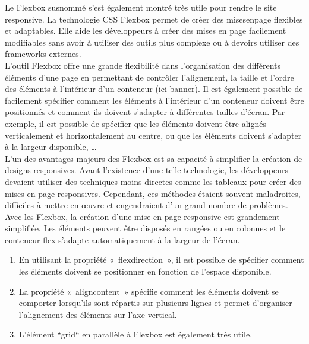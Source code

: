 \documentclass[a4,10pt,french]{sphinxmanual}
\begin{document}
\sphinxAtStartPar
Le Flex\sphinxhyphen{}box susnommé s’est également montré très utile pour rendre le site responsive. La technologie CSS Flex\sphinxhyphen{}box permet de créer des mises\sphinxhyphen{}en\sphinxhyphen{}page flexibles et adaptables. Elle aide les développeurs à créer des mises en page facilement modifiables sans avoir à utiliser des outils plus complexe ou à devoirs utiliser des frameworks externes.\\
L’outil Flex\sphinxhyphen{}box offre une grande flexibilité dans l’organisation des différents éléments d’une page en permettant de contrôler l’alignement, la taille et l’ordre des éléments à l’intérieur d’un conteneur (ici banner). Il est également possible de facilement spécifier comment les éléments à l’intérieur d’un conteneur doivent être positionnés et comment ils doivent s’adapter à différentes tailles d’écran. Par exemple, il est possible de spécifier que les éléments doivent être alignés verticalement et horizontalement au centre, ou que les éléments doivent s’adapter à la largeur disponible, …\\
L’un des avantages majeurs des Flex\sphinxhyphen{}box est sa capacité à simplifier la création de designs responsives. Avant l’existence d’une telle technologie, les développeurs devaient utiliser des techniques moins directes comme les tableaux pour créer des mises en page responsives. Cependant, ces méthodes étaient souvent maladroites, difficiles à mettre en œuvre et engendraient d’un grand nombre de problèmes.\\
Avec les Flex\sphinxhyphen{}box, la création d’une mise en page responsive est grandement simplifiée. Les éléments peuvent être disposés en rangées ou en colonnes et le conteneur flex s’adapte automatiquement à la largeur de l’écran.
\begin{enumerate}
%
\item {} 
\sphinxAtStartPar
En utilisant la propriété « flex\sphinxhyphen{}direction », il est possible de spécifier comment les éléments doivent se positionner en fonction de l’espace disponible.

\item {} 
\sphinxAtStartPar
La propriété « align\sphinxhyphen{}content » spécifie comment les éléments doivent se comporter lorsqu’ils sont répartis sur plusieurs lignes et permet d’organiser l’alignement des éléments sur l’axe vertical.

\item {} 
\sphinxAtStartPar
L’élément “grid“ en parallèle à Flex\sphinxhyphen{}box est également très utile.

\end{enumerate}
\end{document}
